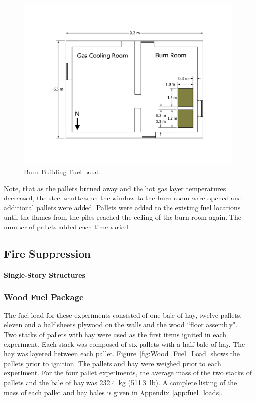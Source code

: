 \documentclass[12pt,oneside]{book}
\begin{document}
\begin{figure}[!ht]
	\includegraphics[width=\columnwidth]{../Figures/Floor_Plans/PDFs/West_Structure/DelCo_2012_West_Structure_Pallets}
	\caption{Burn Building Fuel Load.}
	\label{fig:Burn_Building_Fuel_Load}
\end{figure}

Note, that as the pallets burned away and the hot gas layer temperatures decreased, the steel shutters on the window to the burn room were opened and additional pallets were added. Pallets were added to the existing fuel locations until the flames from the piles reached the ceiling of the burn room again. The number of pallets added each time varied.

\clearpage

\subsection{Fire Suppression}
\label{sec:Fuel_Load_Fire_Suppression}

\paragraph{Single-Story Structures}
\label{sec:suppresion_single}

\subsubsection{Wood Fuel Package}
\label{sec:fire_suppression_pallet_fuel}

The fuel load for these experiments consisted of one bale of hay, twelve pallets, eleven and a half sheets plywood on the walls and the wood ``floor assembly". Two stacks of pallets with hay were used as the first items ignited in each experiment. Each stack was composed of six pallets with a half bale of hay. The hay was layered between each pallet. Figure~\ref{fig:Wood_Fuel_Load} shows the pallets prior to ignition. The pallets and hay were weighed prior to each experiment. For the four pallet experiments, the average mass of the two stacks of pallets and the bale of hay was 232.4~kg (511.3~lb). A complete listing of the mass of each pallet and hay bales is given in Appendix~\ref{app:fuel_loads}.
\end{document}
